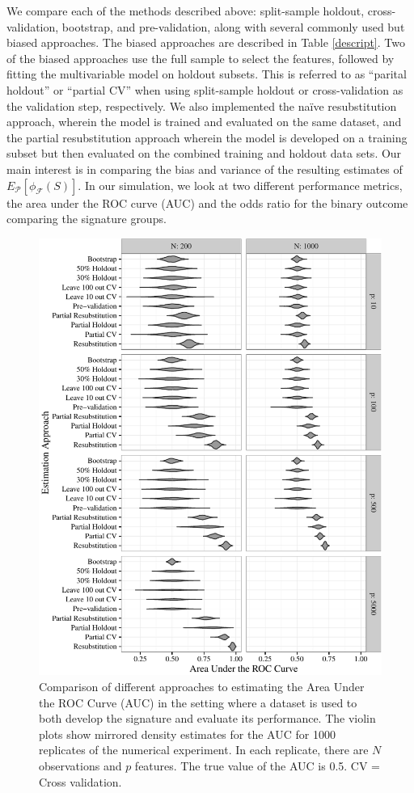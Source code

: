 \documentclass[11pt,]{article}
\begin{document}
We compare each of the methods described above: split-sample holdout,
cross-validation, bootstrap, and pre-validation, along with several
commonly used but biased approaches. The biased approaches are described
in Table \ref{descript}. Two of the biased approaches use the full
sample to select the features, followed by fitting the multivariable
model on holdout subsets. This is referred to as ``parital holdout'' or
``partial CV'' when using split-sample holdout or cross-validation as
the validation step, respectively. We also implemented the naïve
resubstitution approach, wherein the model is trained and evaluated on
the same dataset, and the partial resubstitution approach wherein the
model is developed on a training subset but then evaluated on the
combined training and holdout data sets. Our main interest is in
comparing the bias and variance of the resulting estimates of
\(E_{\mathcal{P}}[\phi_{\mathcal{F}}(S)]\). In our simulation, we look
at two different performance metrics, the area under the ROC curve (AUC)
and the odds ratio for the binary outcome comparing the signature
groups.

\begin{figure}[htbp]
\centering
\includegraphics{paper-revised-round2_files/figure-latex/cvsims-1.pdf}
\caption{Comparison of different approaches to estimating the Area Under
the ROC Curve (AUC) in the setting where a dataset is used to both
develop the signature and evaluate its performance. The violin plots
show mirrored density estimates for the AUC for 1000 replicates of the
numerical experiment. In each replicate, there are \(N\) observations
and \(p\) features. The true value of the AUC is 0.5. CV = Cross
validation. \label{fig1}}
\end{figure}
\end{document}
